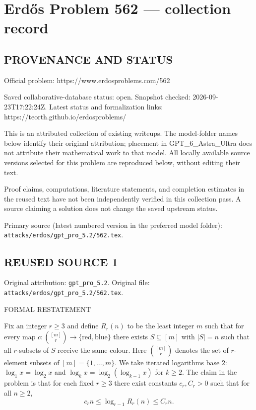 \section*{Erd\H{o}s Problem 562 --- collection record}

\subsection*{PROVENANCE AND STATUS}
Official problem: https://www.erdosproblems.com/562

Saved collaborative-database status: open.
Snapshot checked: 2026-09-23T17:22:24Z.
Latest status and formalization links: https://teorth.github.io/erdosproblems/

This is an attributed collection of existing writeups. The model-folder names below identify their original attribution; placement in GPT\_6\_Astra\_Ultra does not attribute their mathematical work to that model. All locally available source versions selected for this problem are reproduced below, without editing their text.

Proof claims, computations, literature statements, and completion estimates in the reused text have not been independently verified in this collection pass. A source claiming a solution does not change the saved upstream status.

Primary source (latest numbered version in the preferred model folder): \texttt{attacks/erdos/gpt\_pro\_5.2/562.tex}.

\subsection*{REUSED SOURCE 1}
Original attribution: \texttt{gpt\_pro\_5.2}.
Original file: \texttt{attacks/erdos/gpt\_pro\_5.2/562.tex}.


FORMAL RESTATEMENT

Fix an integer $r\ge 3$ and define $R_r(n)$ to be the least integer $m$ such that for every map
$c:\binom{[m]}{r}\to\{\text{red},\text{blue}\}$ there exists $S\subseteq[m]$ with $|S|=n$ such that all $r$-subsets of $S$ receive the same colour.
Here $\binom{[m]}{r}$ denotes the set of $r$-element subsets of $[m]=\{1,\dots,m\}$. We take iterated logarithms base $2$:
$\log_1 x = \log_2 x$ and $\log_k x = \log_2(\log_{k-1} x)$ for $k\ge 2$.
The claim in the problem is that for each fixed $r\ge 3$ there exist constants $c_r,C_r>0$ such that for all $n\ge 2$,
\[
 c_r n \le \log_{r-1} R_r(n) \le C_r n.
\]

